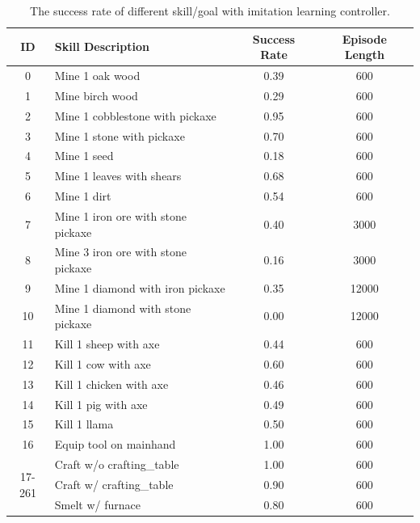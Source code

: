 \begin{table}[H]
\centering
\caption{The success rate of different skill/goal with imitation learning controller.}
\renewcommand\arraystretch{1.1}
\label{tab:skill_success_rate}
\begin{tabular}{@{}clcc@{}}
\toprule
\multicolumn{1}{c}{ID} & Skill Description & Success Rate & Episode Length \\ \midrule
0 & Mine 1 oak wood & 0.39 & 600 \\
1 & Mine birch wood & 0.29 & 600 \\
2 & Mine 1 cobblestone with pickaxe & 0.95 & 600 \\
3 & Mine 1 stone with pickaxe & 0.70 & 600 \\
4 & Mine 1 seed & 0.18 & 600 \\
5 & Mine 1 leaves with shears & 0.68 & 600 \\
6 & Mine 1 dirt & 0.54 & 600 \\
7 & Mine 1 iron ore with stone pickaxe & 0.40 & 3000 \\
8 & Mine 3 iron ore with stone pickaxe & 0.16 & 3000 \\
9 & Mine 1 diamond with iron pickaxe & 0.35 & 12000 \\
10 & Mine 1 diamond with stone pickaxe & 0.00 & 12000 \\
11 & Kill 1 sheep with axe & 0.44 & 600 \\
12 & Kill 1 cow with axe & 0.60 & 600 \\
13 & Kill 1 chicken with axe & 0.46 & 600 \\
14 & Kill 1 pig with axe & 0.49 & 600 \\
15 & Kill 1 llama & 0.50 & 600 \\
16 & Equip tool on mainhand & 1.00 & 600 \\
\multirow{3}{*}{17-261} & Craft w/o crafting\_table & 1.00 & 600 \\
 & Craft w/ crafting\_table & 0.90 & 600 \\
 & Smelt w/ furnace & 0.80 & 600 \\ \bottomrule
\end{tabular}
\end{table}